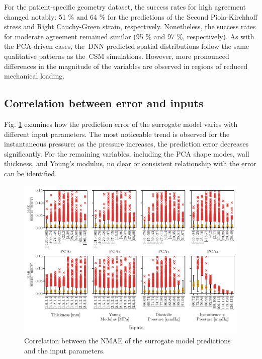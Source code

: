 \documentclass[a4paper,fleqn]{cas-sc}
\begin{document}
    For the patient-specific geometry dataset, the success rates for high agreement changed notably: 51 \% and 64 \% for the predictions of the Second Piola-Kirchhoff stress and Right Cauchy-Green strain, respectively. Nonetheless, the success rates for moderate agreement remained similar (95 \% and 97 \%, respectively). As with the PCA-driven cases, the~\gls{DNN} predicted spatial distributions follow the same qualitative patterns as the~\gls{CSM} simulations. However, more pronounced differences in the magnitude of the variables are observed in regions of reduced mechanical loading.

\subsection{Correlation between error and inputs}
  Fig. \ref{fig:inVsout} examines how the prediction error of the surrogate model varies with different input parameters. The most noticeable trend is observed for the instantaneous pressure: as the pressure increases, the prediction error decreases significantly. For the remaining variables, including the PCA shape modes, wall thickness, and Young's modulus, no clear or consistent relationship with the error can be identified. 
  
  \begin{figure}
    \centering
    \includegraphics[width=.95\textwidth]{fig8}
    \caption{Correlation between the NMAE of the surrogate model predictions and the input parameters.}
    \label{fig:inVsout}
  \end{figure}

\end{document}
